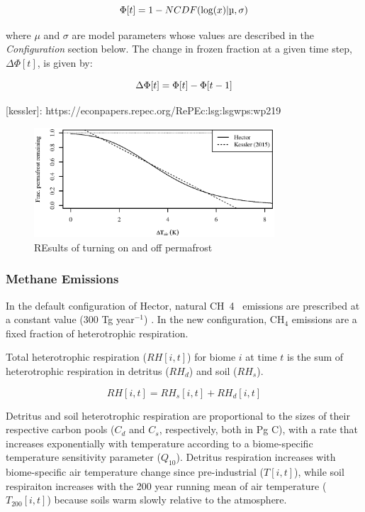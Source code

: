 \documentclass[essd, manuscript]{copernicus}
\begin{document}
\begin{equation*}
\Phi[t] = 1 - NCDF(\log(x) | \mu, \sigma)\\
\end{equation*}

where $\mu$ and $\sigma$ are model parameters whose values are described in the \textit{Configuration} section below.
The change in frozen fraction at a given time step, $\Delta \Phi[t]$, is given by:

\begin{equation*}
\Delta \Phi[t] = \Phi[t] - \Phi[t-1]\\
\end{equation*}

[kessler]: https://econpapers.repec.org/RePEc:lsg:lsgwps:wp219

\begin{figure}
    \centering
    \includegraphics[width=0.8\textwidth]{figures/hector_vs_kessler.eps}
    \caption{REsults of turning on and off permafrost}
    \label{fig:4panel}
\end{figure}


\subsubsection{Methane Emissions}
In the default configuration of Hector, natural CH~4~ emissions are prescribed at a constant value (300 Tg year$^{-1}$) \citep{hartin_2015_simple}.
In the new configuration, CH$_4$ emissions are a fixed fraction of heterotrophic respiration.

Total heterotrophic respiration ($RH[i,t]$) for biome $i$ at time $t$ is the sum of heterotrophic respiration in detritus ($RH_d$) and soil ($RH_s$).

\begin{equation*} 
RH[i,t] = RH_s[i,t] + RH_d[i,t]
\end{equation*}

Detritus and soil heterotrophic respiration are proportional to the sizes of their respective carbon pools ($C_d$ and $C_s$, respectively, both in Pg C),
with a rate that increases exponentially with temperature according to a biome-specific temperature sensitivity parameter ($Q_{10}$).
Detritus respiration increases with biome-specific air temperature change since pre-industrial ($T[i,t]$),
while soil respiraiton increases with the 200 year running mean of air temperature ($T_{200}[i,t]$) because soils warm slowly relative to the atmosphere.
\end{document}
